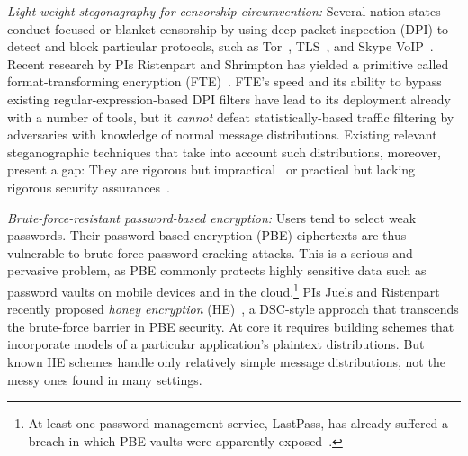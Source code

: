 \begin{newitemize} 
\item{\em Light-weight stegonagraphy for censorship
circumvention:} Several nation states conduct focused or blanket censorship by
using deep-packet inspection (DPI) to detect and block particular protocols,
such as
Tor~\cite{Tor:iran_block-2011,Tor:iran_block,Tor:china_block_one,Tor:china_block,
Tor:china_active_probe,Winter2012,Clayton06ignoringthe},
TLS~\cite{TLS:iran_block}, and Skype VoIP~\cite{China_skype_ban,UAE_skype_ban}.
Recent research by PIs Ristenpart and Shrimpton has yielded a primitive called
format-transforming encryption (FTE)~\cite{..}.  FTE's speed and its ability to
bypass existing regular-expression-based DPI filters have lead to its 
deployment already with a number of tools, but it {\em cannot} defeat 
statistically-based traffic filtering by adversaries with knowledge of normal
message distributions. Existing relevant steganographic techniques that take
into account such distributions, moreover, present a gap: They are rigorous but
impractical~\cite{Hopper:Provable_Stego} or practical but lacking rigorous
security assurances~\cite{Stegotorus}. %


\item{\em Brute-force-resistant password-based encryption:} Users tend to select
weak passwords. Their password-based encryption (PBE) ciphertexts are thus
vulnerable to brute-force password cracking attacks. This is a serious and
pervasive problem, as PBE commonly protects highly sensitive data such as
password vaults on mobile devices and in the cloud.\footnote{At least one
password management service, LastPass, has already suffered a breach in which
PBE vaults were apparently exposed~\cite{}.}  PIs Juels and Ristenpart recently
proposed {\em honey encryption} (HE)~\cite{HoneyEnc-EC:2014}, a DSC-style
approach that transcends the brute-force barrier in PBE security. At core it
requires building schemes that incorporate models of a particular
application's plaintext distributions. But known HE schemes handle only relatively
simple message distributions, not the messy ones found in many settings.


\end{newitemize}
